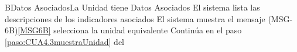 	
		\begin{UCtrayectoriaA}{B}{Datos Asociados}{La Unidad tiene Datos Asociados}
		 	\UCpaso El sistema lista las descripciones de los indicadores asociados
			\UCpaso El sistema muestra el mensaje (MSG-6B)\ref{MSG6B}
			\UCpaso [\UCactor] selecciona la unidad equivalente 
			\UCpaso Continúa en el paso \ref{paso:CUA4.3muestraUnidad} del 			
		\end{UCtrayectoriaA}
		

